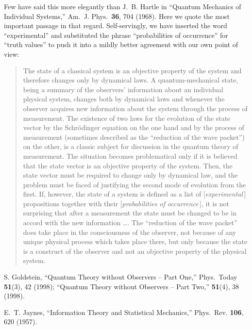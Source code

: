 \documentclass[12pt,aps,eqsecnum]{revtex4-1}
\begin{document}
\begin{thebibliography}{10}
Few have said this more elegantly than J.~B. Hartle in ``Quantum
Mechanics of Individual Systems,'' Am.\ J. Phys.\ {\bf 36}, 704
(1968).  Here we quote the most important passage in that regard.
Self-servingly, we have inserted the word ``experimental'' and
substituted the phrase ``probabilities of occurrence'' for ``truth
values'' to push it into a mildly better agreement with our own
point of view:
\begin{quotation}
\footnotesize\indent The state of a classical system is an objective
property of the system and therefore changes only by dynamical laws.
A quantum-mechanical state, being a summary of the observers'
information about an individual physical system, changes both by
dynamical laws and whenever the observer acquires new information
about the system through the process of measurement.  The existence
of two laws for the evolution of the state vector by the
Schr\"odinger equation on the one hand and by the process of
measurement (sometimes described as the ``reduction of the wave
packet'') on the other, is a classic subject for discussion in the
quantum theory of measurement. The situation becomes problematical
only if it is believed that the state vector is an objective
property of the system. Then, the state vector must be required to
change only by dynamical law, and the problem must be faced of
justifying the second mode of evolution from the first. If, however,
the state of a system is defined as a list of [{\it experimental\,}]
propositions together with their [{\it probabilities of
occurrence\,}], it is not surprising that after a measurement the
state must be changed to be in accord with the new information
\ldots\@.
The ``reduction of the wave
packet'' does take place in the consciousness of the observer, not
because of any unique physical process which takes place there, but
only because the state is a construct of the observer and not an
objective property of the physical system.
\end{quotation}

S. Goldstein, ``Quantum Theory without Observers -- Part One,''
Phys.\ Today {\bf 51}(3), 42 (1998); ``Quantum Theory without
Observers -- Part Two,'' {\bf 51}(4), 38 (1998).

E.~T. Jaynes, ``Information Theory and Statistical Mechanics,''
Phys.\ Rev. {\bf 106}, 620 (1957).


\end{thebibliography}
\end{document}
